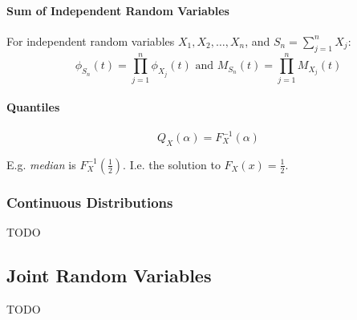 \documentclass[twocolumn,english]{article}
\begin{document}
\paragraph{Sum of Independent Random Variables}

For independent random variables $X_{1},X_{2},\dots,X_{n}$, and $S_{n}=\sum_{j=1}^{n}X_{j}$:
\[
\phi_{S_{n}}\left(t\right)=\prod_{j=1}^{n}\phi_{X_{j}}\left(t\right)\text{ and }M_{S_{n}}\left(t\right)=\prod_{j=1}^{n}M_{X_{j}}\left(t\right)
\]

\paragraph{Quantiles}

\[
Q_{X}\left(\alpha\right)=F_{X}^{-1}\left(\alpha\right)
\]

E.g. \emph{median} is $F_{X}^{-1}\left(\frac{1}{2}\right)$. I.e.
the solution to $F_{X}\left(x\right)=\frac{1}{2}$.

\subsubsection{Continuous Distributions}

TODO

\subsection{Joint Random Variables}

TODO
\end{document}
